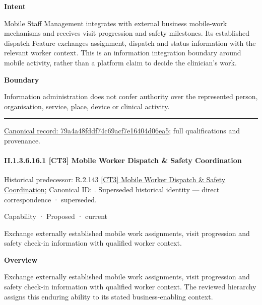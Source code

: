 \textbf{Intent}



Mobile Staff Management integrates with external business mobile-work mechanisms and receives visit progression and safety milestones. Its established dispatch Feature exchanges assignment, dispatch and status information with the relevant worker context. This is an information integration boundary around mobile activity, rather than a platform claim to decide the clinician's work.



\textbf{Boundary}



Information administration does not confer authority over the represented person, organisation, service, place, device or clinical activity.



\medskip\hrule\medskip

{\footnotesize \href{../../../../continuum/strategy/capability/79a4a48fddf74c69acf7e16404d06ea5.md}{Canonical record: 79a4a48fddf74c69acf7e16404d06ea5}; full qualifications and provenance.}\par
\paragraph*{II.1.3.6.16.1 [CT3] Mobile Worker Dispatch \& Safety Coordination}
\label{navigation:II.1.3.6.16.1}

{\small Historical predecessor: R.2.143 \hyperref[element:5aafd1f4bff046b2b532c20dfb191473]{[CT3] Mobile Worker Dispatch \& Safety Coordination}; Canonical ID: \texttt{}. Superseded historical identity — direct correspondence · superseded.}\par
\label{element:d72164668dfe448bbebe74e9e1a75233}
{\small Capability · Proposed · current}\par

Exchange externally established mobile work assignments, visit progression and safety check-in information with qualified worker context.



\textbf{Overview}



Exchange externally established mobile work assignments, visit progression and safety check-in information with qualified worker context. The reviewed hierarchy assigns this enduring ability to its stated business-enabling context.



